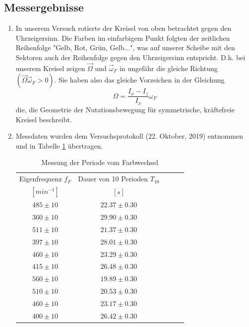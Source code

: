 \documentclass[a4paper,10pt]{article}
\begin{document}
\subsection{Messergebnisse}
\begin{enumerate}[label=(\alph*)]
\item In unserem Versuch rotierte der Kreisel von oben betrachtet gegen den Uhrzeigersinn. Die Farben im einfarbigem Punkt folgten der zeitlichen Reihenfolge "Gelb, Rot, Grün, Gelb...", was auf unserer Scheibe mit den Sektoren auch der Reihenfolge gegen den Uhrzeigersinn entspricht. D.h. bei unserem Kreisel zeigen \(\vec{\Omega}\) und \(\vec{\omega}_F\) in ungefähr die gleiche Richtung \((\vec{\Omega} \vec{\omega}_F > 0)\). Sie haben also das gleiche Vorzeichen in der Gleichung 
\begin{equation} \label{eq:sign}
	\Omega= \frac{{I_x}-{I_z}}{I_x}{\omega_F}
\end{equation} 
die, die Geometrie der Nutationsbewegung für symmetrische, kräftefreie Kreisel beschreibt.

\item Messdaten wurden dem Versuchsprotokoll (22. Oktober, 2019) entnommen und in Tabelle \ref{tab:Tab3} übertragen.
\unboldmath
\begin{table}[htb]
\centering
\caption{Messung der Periode vom Farbwechsel}\label{tab:Tab3}
\begin{threeparttable}
\begin{tabular}{ccccc}
\toprule
Eigenfrequenz \boldmath\(f_F\)\unboldmath & Dauer von 10 Perioden \boldmath\(T_{10}\)\unboldmath\\
\([min^{-1}]\)&\([s]\)\\
\midrule
\(485\pm10\)&\(22.37\pm0.30\)\\
\(360\pm10\)&\(29.90\pm0.30\)\\
\(511\pm10\)&\(21.37\pm0.30\)\\
\(397\pm10\)&\(28.01\pm0.30\)\\
\(460\pm10\)&\(23.29\pm0.30\)\\
\(415\pm10\)&\(26.48\pm0.30\)\\
\(560\pm10\)&\(19.89\pm0.30\)\\
\(510\pm10\)&\(20.53\pm0.30\)\\
\(460\pm10\)&\(23.17\pm0.30\)\\
\(400\pm10\)&\(26.42\pm0.30\)\\
\bottomrule
 \end{tabular}
\end{threeparttable}\end{table}
\boldmath
\end{enumerate}
\end{document}
